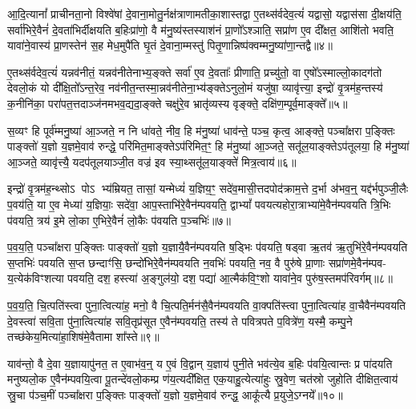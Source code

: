 आ॒दि॒त्यानां᳚ प्राचीनता॒नो विश्वे॑षां दे॒वाना॒मोतु॒र्नक्ष॑त्राणामतीका॒शास्तद्वा ए॒तथ्स॑र्वदेव॒त्यं॑ यद्वासो॒ यद्वास॑सा दी॒क्षय॑ति॒ सर्वा॑भिरे॒वैनं॑ दे॒वता॑भिर्दीक्षयति ब॒हिःप्रा॑णो॒ वै म॑नु॒ष्य॑स्तस्याश॑नं प्रा॒णो᳚\-ऽश्ञाति॒ सप्रा॑ण ए॒व दी᳚क्षत॒ आशि॑तो भवति॒ यावा॑ने॒वास्य॑ प्रा॒णस्तेन॑ स॒ह मेध॒मुपै॑ति घृ॒तं दे॒वाना॒म्मस्तु॑ पितृ॒णान्निष्प॑क्वम्मनु॒ष्या॑णा॒न्तद्वै॥४॥

ए॒तथ्स॑र्वदेव॒त्यं॑ यन्नव॑नीतं॒ यन्नव॑नीतेनाभ्य॒ङ्क्ते सर्वा॑ ए॒व दे॒वताः᳚ प्रीणाति॒ प्रच्यु॑तो॒ वा ए॒षो᳚\-ऽस्माल्लो॒कादग॑तो देवलो॒कं यो दी᳚क्षि॒तो᳚\-ऽन्त॒रेव॒ नव॑नीत॒न्तस्मा॒न्नव॑नीतेना॒भ्य॑ङ्क्ते\-ऽनुलो॒मं यजु॑षा॒ व्यावृ॑त्त्या॒ इन्द्रो॑ वृ॒त्रम॑ह॒न्तस्य॑ क॒नीनि॑का॒ परा॑पत॒त्तदाञ्ज॑नमभव॒द्यदा॒ङ्क्ते चक्षु॑रे॒व भ्रातृ॑व्यस्य वृङ्क्ते॒ दक्षि॑ण॒म्पूर्व॒माङ्क्ते᳚॥५॥

स॒व्यꣳ हि पूर्व॑म्मनु॒ष्या॑ आ॒ञ्जते॒ न नि धा॑वते॒ नीव॒ हि म॑नु॒ष्या॑ धाव॑न्ते॒ पञ्च॒ कृत्व॒ आङ्क्ते॒ पञ्चा᳚क्षरा प॒ङ्क्तिः पाङ्क्तो॑ य॒ज्ञो य॒ज्ञमे॒वाव॑ रुन्द्धे॒ परि॑मित॒माङ्क्ते\-ऽप॑रिमित॒ꣳ॒ हि म॑नु॒ष्या॑ आ॒ञ्जते॒ सतू॑ल॒याङ्क्ते\-ऽप॑तूलया॒ हि म॑नु॒ष्या॑ आ॒ञ्जते॒ व्यावृ॑त्त्यै॒ यदप॑तूलयाञ्जी॒त वज्र॑ इव स्या॒थ्सतू॑ल॒याङ्क्ते॑ मित्र॒त्वाय॑॥६॥

इन्द्रो॑ वृ॒त्रम॑ह॒न्थ्सो\-ऽ पो\-ऽ भ्य॑म्रियत॒ तासां॒ यन्मेध्यं॑ य॒ज्ञिय॒ꣳ॒ सदे॑व॒मासी॒त्तदपोद॑क्राम॒त्ते द॒र्भा अ॑भव॒न्॒ यद्द॑र्भपुञ्जी॒लैः प॒वय॑ति॒ या ए॒व मेध्या॑ य॒ज्ञियाः॒ सदे॑वा॒ आप॒स्ताभि॑रे॒वैन॑म्पवयति॒ द्वा\-भ्यां᳚ पवयत्यहोरा॒त्राभ्या॑मे॒वैन॑म्पवयति त्रि॒भिः प॑वयति॒ त्रय॑ इ॒मे लो॒का ए॒भिरे॒वैनं॑ लो॒कैः प॑वयति प॒ञ्चभिः॑॥७॥

प॒व॒य॒ति॒ पञ्चा᳚क्षरा प॒ङ्क्तिः पाङ्क्तो॑ य॒ज्ञो य॒ज्ञायै॒वैन॑म्पवयति ष॒ड्भिः प॑वयति॒ षड्वा ऋ॒तव॑ ऋ॒तुभि॑रे॒वैन॑म्पवयति स॒प्तभिः॑ पवयति स॒प्त छन्दाꣳ॑सि॒ छन्दो॑भिरे॒वैन॑म्पवयति न॒वभिः॑ पवयति॒ नव॒ वै पुरु॑षे प्रा॒णाः सप्रा॑णमे॒वैन॑म्पव- य॒त्येक॑विꣳशत्या पवयति॒ दश॒ हस्त्या॑ अ॒ङ्गुल॑यो॒ दश॒ पद्या॑ आ॒त्मैक॑वि॒ꣳ॒शो यावा॑ने॒व पुरु॑ष॒स्तमप॑रिवर्गम्॥८॥

प॒व॒य॒ति॒ चि॒त्पति॑स्त्वा पुना॒त्वित्या॑ह॒ मनो॒ वै चि॒त्पति॒र्मन॑सै॒वैन॑म्पवयति वा॒क्पति॑स्त्वा पुना॒त्वित्या॑ह वा॒चैवैन॑म्पवयति दे॒वस्त्वा॑ सवि॒ता पु॑ना॒त्वित्या॑ह सवि॒तृप्र॑सूत ए॒वैन॑म्पवयति॒ तस्य॑ ते पवित्रपते प॒वित्रे॑ण॒ यस्मै॒ कम्पु॒ने तच्छ॑केय॒मित्या॑हा॒शिष॑मे॒वैतामा शा᳚स्ते॥९॥

{}

याव॑न्तो॒ वै दे॒वा य॒ज्ञायापु॑नत॒ त ए॒वाभ॑व॒न्॒ य ए॒वं वि॒द्वान् य॒ज्ञाय॑ पुनी॒ते भव॑त्ये॒व ब॒हिः प॑वयि॒त्वान्तः प्र पा॑दयति मनुष्यलो॒क ए॒वैन॑म्पवयि॒त्वा पू॒तन्दे॑वलो॒कम्प्र ण॑य॒त्यदी᳚क्षित॒ एक॒याहु॒त्येत्या॑हुः स्रु॒वेण॒ चत॑स्रो जुहोति दीक्षित॒त्वाय॑ स्रु॒चा प॑ञ्च॒मीं पञ्चा᳚क्षरा प॒ङ्क्तिः पाङ्क्तो॑ य॒ज्ञो य॒ज्ञमे॒वाव॑ रुन्द्ध॒ आकू᳚त्यै प्र॒युजे॒\-ऽग्नये᳚॥१०॥

